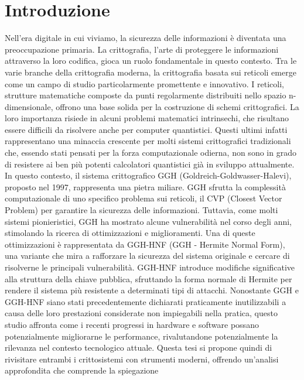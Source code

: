 \chapter{Introduzione}
\label{cap1}

Nell'era digitale in cui viviamo, la sicurezza delle informazioni è diventata una 
preoccupazione primaria. La crittografia, l'arte di proteggere le informazioni attraverso 
la loro codifica, gioca un ruolo fondamentale in questo contesto. Tra le varie branche 
della crittografia moderna, la crittografia basata sui reticoli emerge come un campo di 
studio particolarmente promettente e innovativo.
I reticoli, strutture matematiche composte da punti regolarmente distribuiti nello spazio 
n-dimensionale, offrono una base solida per la costruzione di schemi crittografici. La 
loro importanza risiede in alcuni problemi matematici intrinsechi, che risultano 
essere difficili da risolvere anche per computer quantistici. Questi ultimi infatti 
rappresentano una minaccia crescente per molti sistemi crittografici tradizionali 
che, essendo stati pensati per la forza computazionale odierna, non sono in grado di 
resistere ai ben più potenti calcolatori quantistici già in sviluppo attualmente. 
In questo contesto, il sistema crittografico GGH (Goldreich-Goldwasser-Halevi), 
proposto nel 1997, rappresenta una pietra miliare. GGH sfrutta la complessità 
computazionale di uno specifico problema sui reticoli, il CVP (Closest Vector Problem) 
per garantire la sicurezza delle informazioni. Tuttavia, come molti sistemi 
pionieristici, GGH ha mostrato alcune 
vulnerabilità nel corso degli anni, stimolando la ricerca di ottimizzazioni e 
miglioramenti. 
Una di queste ottimizzazioni è rappresentata da GGH-HNF (GGH - Hermite Normal Form), 
una variante che mira a rafforzare la sicurezza del sistema originale e cercare di risolverne 
le principali vulnerabilità. GGH-HNF introduce 
modifiche significative alla struttura della chiave pubblica, sfruttando la forma normale 
di Hermite per rendere il sistema più resistente a determinati tipi di attacchi.
Nonostante GGH e GGH-HNF siano stati precedentemente dichiarati praticamente 
inutilizzabili a causa delle loro prestazioni considerate non impiegabili nella pratica, 
questo studio affronta come i recenti progressi in hardware e software possano potenzialmente 
migliorarne le performance, rivalutandone potenzialmente la rilevanza nel contesto 
tecnologico attuale. Questa tesi si propone quindi di rivisitare entrambi i crittosistemi con 
strumenti moderni, offrendo un'analisi approfondita che comprende la spiegazione 
